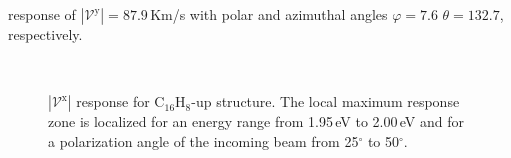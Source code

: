 \documentclass[prb,11pt,tightenlines,twocolumn,aps]{revtex4-1}
\begin{document}
response of $|\mathcal{V}^{\mathrm{y}}|=87.9$\,Km/s with polar and azimuthal
angles $\varphi=7.6$ $\theta=132.7$, respectively.
\begin{figure}[t]
    \centering
    \\
    \caption{$|\mathcal{V}^{\mathrm{x}}|$ response for C$_{16}$H$_{8}$-up
    structure. The local maximum response zone is localized for an energy range
    from 1.95\,eV to 2.00\,eV and for a polarization angle of the incoming beam
    from 25$^{\circ}$ to 50$^{\circ}$.}
    \label{fig:up-3d-2}
\end{figure}
\end{document}

